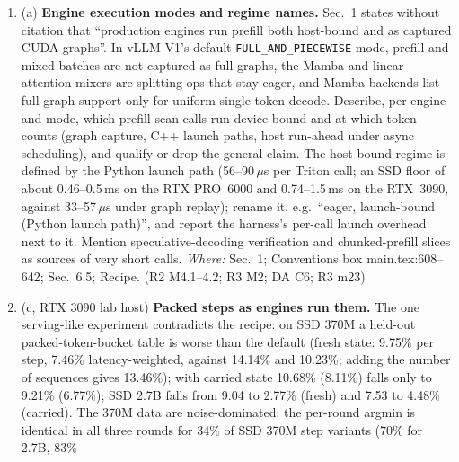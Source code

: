 \documentclass[11pt]{article}
\begin{document}
\begin{enumerate}[label=M3\alph*.]
        scan share of the forward pass and a main-text ``deployment effect''
        table (oracle scan time, default and table regret in ms, share of the
        full forward pass) at three or four representative tokens-per-call
        points, next to ``\% of scan time''. About 4--8 GPU-hours. This is the
        minimum end-to-end evidence; it decides M1d. \emph{Where:} Table~7;
        Sec.~6.5; Limitations main.tex:1425--1429. (R1 M1 fix (ii); EIC M1 fix
        (c); R3 M1 fix 1; R2 M4.6; ED)
  \item (a) \textbf{Engine execution modes and regime names.} Sec.~1 states
        without citation that ``production engines run prefill both host-bound
        and as captured CUDA graphs''. In vLLM V1's default
        \texttt{FULL\_AND\_PIECEWISE} mode, prefill and mixed batches are not
        captured as full graphs, the Mamba and linear-attention mixers are
        splitting ops that stay eager, and Mamba backends list full-graph
        support only for uniform single-token decode. Describe, per engine and
        mode, which prefill scan calls run device-bound and at which token
        counts (graph capture, C++ launch paths, host run-ahead under async
        scheduling), and qualify or drop the general claim. The host-bound
        regime is defined by the Python launch path (56--90\,$\mu$s per Triton
        call; an SSD floor of about 0.46--0.5\,ms on the RTX PRO~6000 and
        0.74--1.5\,ms on the RTX~3090, against 33--57\,$\mu$s under graph
        replay); rename it, e.g.\ ``eager, launch-bound (Python launch
        path)'', and report the harness's per-call launch overhead next to
        it. Mention speculative-decoding verification and chunked-prefill
        slices as sources of very short calls. \emph{Where:} Sec.~1;
        Conventions box main.tex:608--642; Sec.~6.5; Recipe. (R2 M4.1--4.2;
        R3 M2; DA C6; R3 m23)
  \item (c, RTX 3090 lab host) \textbf{Packed steps as engines run them.} The
        one serving-like experiment contradicts the recipe: on SSD 370M a
        held-out packed-token-bucket table is worse than the default (fresh
        state: 9.75\% per step, 7.46\% latency-weighted, against 14.14\% and
        10.23\%; adding the number of sequences gives 13.46\%); with carried
        state 10.68\% (8.11\%) falls only to 9.21\% (6.77\%); SSD 2.7B falls
        from 9.04 to 2.77\% (fresh) and 7.53 to 4.48\% (carried). The 370M
        data are noise-dominated: the per-round argmin is identical in all
        three rounds for 34\% of SSD 370M step variants (70\% for 2.7B, 83\%

\end{enumerate}
\end{document}
